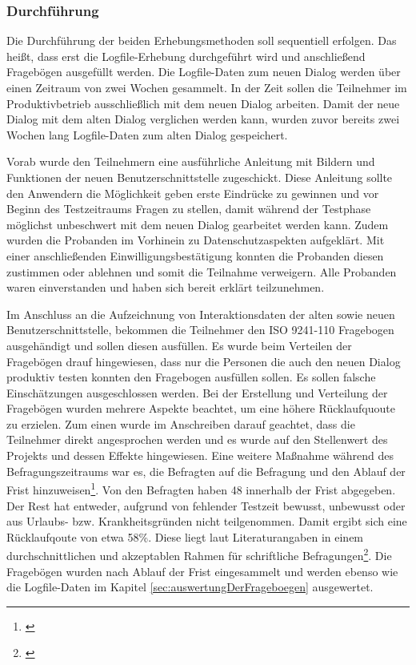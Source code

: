 \subsubsection{Durchführung}
\label{sec:durchfuehrungEvaluation}
Die Durchführung der beiden Erhebungsmethoden soll sequentiell erfolgen. Das heißt, dass erst die Logfile-Erhebung durchgeführt wird und anschließend Fragebögen ausgefüllt werden. Die Logfile-Daten zum neuen Dialog werden über einen Zeitraum von zwei Wochen gesammelt. In der Zeit sollen die Teilnehmer im Produktivbetrieb ausschließlich mit dem neuen Dialog arbeiten. Damit der neue Dialog mit dem alten Dialog verglichen werden kann, wurden zuvor bereits zwei Wochen lang Logfile-Daten zum alten Dialog gespeichert. 

Vorab wurde den Teilnehmern eine ausführliche Anleitung mit Bildern und Funktionen der neuen Benutzerschnittstelle zugeschickt. Diese Anleitung sollte den Anwendern die Möglichkeit geben erste Eindrücke zu gewinnen und vor Beginn des Testzeitraums Fragen zu stellen, damit während der Testphase möglichst unbeschwert mit dem neuen Dialog gearbeitet werden kann. Zudem wurden die Probanden im Vorhinein zu Datenschutzaspekten aufgeklärt. Mit einer anschließenden Einwilligungsbestätigung konnten die Probanden diesen zustimmen oder ablehnen und somit die Teilnahme verweigern. Alle Probanden waren einverstanden und haben sich bereit erklärt teilzunehmen.

Im Anschluss an die Aufzeichnung von Interaktionsdaten der alten sowie neuen Benutzerschnittstelle, bekommen die Teilnehmer den ISO 9241-110 Fragebogen ausgehändigt und sollen diesen ausfüllen. Es wurde beim Verteilen der Fragebögen drauf hingewiesen, dass nur die Personen die auch den neuen Dialog produktiv testen konnten den Fragebogen ausfüllen sollen. Es sollen falsche Einschätzungen ausgeschlossen werden. Bei der Erstellung und Verteilung der Fragebögen wurden mehrere Aspekte beachtet, um eine höhere Rücklaufquoute zu erzielen. Zum einen wurde im Anschreiben darauf geachtet, dass die Teilnehmer direkt angesprochen werden und es wurde auf den Stellenwert des Projekts und dessen Effekte hingewiesen. Eine weitere Maßnahme während des Befragungszeitraums war es, die Befragten auf die Befragung und den Ablauf der Frist hinzuweisen\footnote{\cite[vgl.][58]{Petermann2005}}. Von den Befragten haben 48 innerhalb der Frist abgegeben. Der Rest hat entweder, aufgrund von fehlender Testzeit bewusst, unbewusst oder aus Urlaubs- bzw. Krankheitsgründen nicht teilgenommen. Damit ergibt sich eine Rücklaufqoute von etwa 58\%. Diese liegt laut Literaturangaben in einem durchschnittlichen und akzeptablen Rahmen für schriftliche Befragungen\footnote{\cite[vgl.][58]{Petermann2005}}. Die Fragebögen wurden nach Ablauf der Frist eingesammelt und werden ebenso wie die Logfile-Daten im Kapitel \ref{sec:auswertungDerFrageboegen} ausgewertet.
